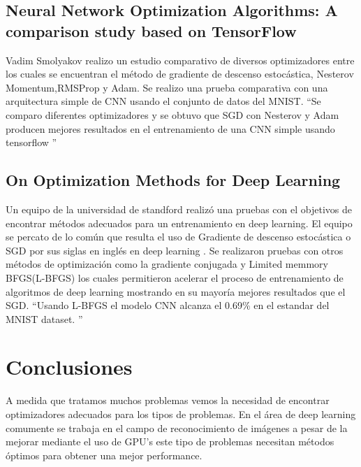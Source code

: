 \subsection{Neural Network Optimization Algorithms: A comparison study based on TensorFlow}
Vadim Smolyakov realizo un estudio comparativo de diversos optimizadores entre los cuales se encuentran el método de gradiente de descenso estocástica, Nesterov Momentum,RMSProp y Adam. Se realizo una prueba comparativa con una arquitectura simple de CNN usando el conjunto de datos del MNIST. \textquotedblleft Se comparo diferentes optimizadores y se obtuvo que SGD con Nesterov y Adam producen mejores resultados en el entrenamiento de una CNN simple usando tensorflow \textquotedblright
\subsection{On Optimization Methods for Deep Learning}
Un equipo de la universidad de standford realizó una pruebas con el objetivos de encontrar métodos adecuados para un entrenamiento en deep learning. El equipo se percato de lo común que resulta el uso de Gradiente de descenso estocástica o SGD por sus siglas en inglés en deep learning . Se realizaron pruebas con otros métodos de optimización como la gradiente conjugada y Limited memmory BFGS(L-BFGS) los cuales permitieron acelerar el proceso de entrenamiento de algoritmos de deep learning mostrando en su mayoría mejores resultados que el SGD. \textquotedblleft Usando L-BFGS el modelo CNN alcanza el 0.69\%  en el estandar del MNIST dataset. \textquotedblright
\section{Conclusiones}
A medida que tratamos muchos problemas vemos la necesidad de encontrar optimizadores adecuados para los tipos de problemas. En el área de deep learning comumente se trabaja en el campo de reconocimiento de imágenes a pesar de la mejorar mediante el uso de GPU's este tipo de problemas necesitan métodos óptimos para obtener una mejor performance.

